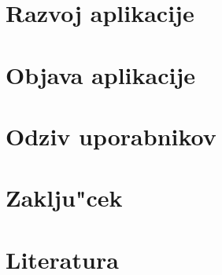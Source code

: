 \documentclass[a4paper, 12pt]{article}
\begin{document}
	\section{Razvoj aplikacije}
	
	
	\section{Objava aplikacije}
	
	
	\section{Odziv uporabnikov}
	
	
	\section{Zaklju"cek}
	
	
	\newpage
	\section{Literatura}
	\printbibliography[heading=none]
\end{document}
